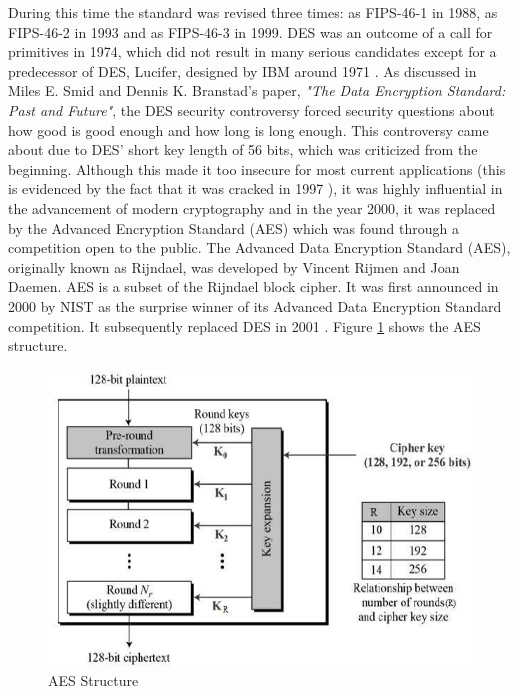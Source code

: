 \documentclass[journal]{IEEEtran}
\begin{document}
During this time the standard was revised three times: as FIPS-46-1 in 1988, as FIPS-46-2 in 1993 and as FIPS-46-3 in 1999. DES was an outcome of a call for primitives in 1974, which did not result in many serious candidates except for a predecessor of DES, Lucifer, designed by IBM around 1971 \cite{des}. As discussed in Miles E. Smid and Dennis K. Branstad's paper, \textit{"The Data Encryption Standard: Past and Future"}, the DES security controversy \cite{des_past&future} forced security questions about how good is good enough and how long is long enough. This controversy came about due to DES' short key length of 56 bits, which was criticized from the beginning. Although this made it too insecure for most current applications (this is evidenced by the fact that it was cracked in 1997 \cite{des_cracked}), it was highly influential in the advancement of modern cryptography \cite{des_overview} and in the year 2000, it was replaced by the Advanced Encryption Standard (AES) which was found through a competition open to the public.
\newline\newline
The Advanced Data Encryption Standard (AES), originally known as Rijndael, was developed by Vincent Rijmen and Joan Daemen. AES is a subset of the Rijndael block cipher. It was first announced in 2000 by NIST as the surprise winner \cite{aes} of its Advanced Data Encryption Standard competition. It subsequently replaced DES in 2001 \cite{encryption_study}. Figure \ref{fig:aes} shows the AES structure.

\newline
\begin{figure}[!h]
    \centering
    \includegraphics[scale=.4]{aes_structure}
    \caption{AES Structure}
    \label{fig:aes}
\end{figure}
\end{document}
